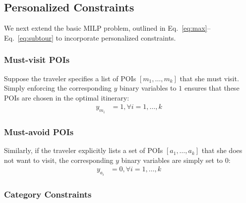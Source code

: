
\subsection{Personalized Constraints}
\label{sec:personalized}

We next extend the basic MILP problem, outlined in Eq.~\eqref{eq:max}--Eq.~\eqref{eq:subtour} to incorporate personalized constraints.

\subsubsection{\textbf{Must-visit POIs}}
\label{sec:must}

Suppose the traveler specifies a list of POIs $[m_1, \dots, m_k]$ that she
must visit.  Simply enforcing the corresponding $y$ binary variables to
$1$ ensures that these POIs are chosen in the optimal itinerary:
%
\begin{align}
	\label{eq:see}
	y_{m_i} & = 1, \forall i = 1, \dots, k
\end{align}

\subsubsection{\textbf{Must-avoid POIs}}
\label{sec:avoid}

Similarly, if the traveler explicitly lists a set of POIs $[a_1, \dots,
a_k]$ that she does not want to visit, the corresponding $y$ binary
variables are simply set to $0$:
%
\begin{align}
	\label{eq:avoid}
	y_{a_i} & = 0, \forall i = 1, \dots, k
\end{align}

\subsubsection{\textbf{Category Constraints}}
\label{sec:category}

